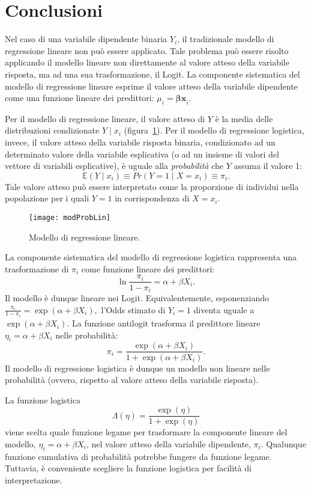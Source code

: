 \section*{Conclusioni}

Nel caso di una variabile dipendente binaria $Y_i$, il tradizionale modello di regressione lineare non può essere applicato. 
Tale problema può essere risolto applicando il modello lineare non direttamente al valore atteso della variabile risposta, ma ad una sua trasformazione, il Logit. 
La componente sistematica del modello di regressione lineare esprime il valore atteso della variabile dipendente come una funzione lineare dei predittori: $\mu_i = \boldsymbol{\beta x}_i$.

Per il modello di regressione lineare, il valore atteso di $Y$ è la media delle distribuzioni condizionate $Y \mid x_i$ (figura~\ref{fig:func_modlinreg}).
Per il modello di regressione logistica, invece, il valore atteso della variabile risposta binaria, condizionato ad un determinato valore della variabile esplicativa (o ad un insieme di valori del vettore di variabili esplicative), è uguale alla \emph{probabilità} che $Y$ assuma il valore 1:
\[
\mathbb{E}(Y \mid x_i) \equiv Pr(Y=1 \mid X=x_i) \equiv \pi_i.
\]
Tale valore atteso può essere interpretato come la proporzione di individui nella popolazione per i quali $Y=1$ in corrispondenza di $X=x_i$.

\begin{figure}[h!]
    \begin{center}
      \texttt{[image: modProbLin]}
\caption{Modello di regressione lineare.}
\label{fig:func_modlinreg}
    \end{center}
  \end{figure}

La componente sistematica del modello di regressione logistica rappresenta una trasformazione di $\pi_i$ come funzione lineare dei predittori:
\[
\ln \frac{\pi_i}{1-\pi_i} = \alpha + \beta X_i.
\]
Il modello è dunque lineare nei Logit. 
Equivalentemente, esponenziando
$
\frac{\pi_i}{1-\pi_i} = \exp(\alpha + \beta X_i), 
$
l'Odds stimato di $Y_i=1$ diventa uguale a $\exp(\alpha + \beta X_i)$. 
La funzione antilogit trasforma il predittore lineare $\eta_i = \alpha + \beta X_i$ nelle probabilità:
\[
\pi_i = \frac{\exp(\alpha+\beta X_i)}{1 + \exp(\alpha+\beta X_i)}.
\]
Il modello di regressione logistica è dunque un modello non lineare nelle probabilità (ovvero, rispetto al valore atteso della variabile risposta).

La funzione logistica
    \[
    \Lambda(\eta) = \frac{\exp(\eta)}{1 + \exp(\eta)}
    \]
viene  scelta quale funzione legame per trasformare la componente lineare del modello, $\eta_i =\alpha+\beta X_i$, nel valore atteso della variabile dipendente, $\pi_i$.
Qualunque funzione cumulativa di probabilità potrebbe fungere da funzione legame.  Tuttavia, è conveniente scegliere la funzione logistica per facilità di interpretazione.

